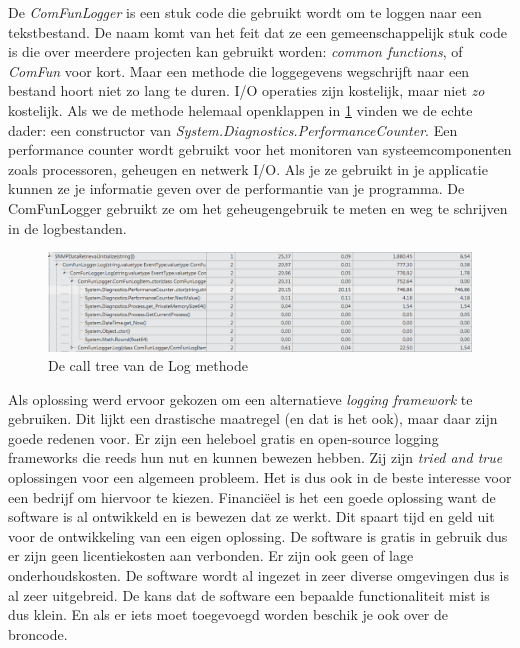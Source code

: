 De \emph{ComFunLogger} is een stuk code die gebruikt wordt om te loggen naar een tekstbestand.
De naam komt van het feit dat ze een gemeenschappelijk stuk code is die over meerdere projecten kan
gebruikt worden: \emph{common functions}, of \emph{ComFun} voor kort.
Maar een methode die loggegevens wegschrijft naar een bestand hoort niet zo lang te duren.
I/O operaties zijn kostelijk, maar niet \emph{zo} kostelijk. 
Als we de methode helemaal openklappen in \figurenamesentence{} \ref{call-tree-performancecounter} vinden we de echte dader:
een constructor van \emph{System.Diagnostics.PerformanceCounter}.
Een performance counter wordt gebruikt voor het monitoren van systeemcomponenten zoals
processoren, geheugen en netwerk I/O. Als je ze gebruikt in je applicatie kunnen ze je 
informatie geven over de performantie van je programma.\cite{performance-counters-intro}
De ComFunLogger gebruikt ze om het geheugengebruik te meten en weg te schrijven in de logbestanden.

\begin{figure}[h]
	\centering
	\includegraphics[scale=0.50]{figures/profiler/call-tree-performancecounter}
	\caption{De call tree van de Log methode}
	\label{call-tree-performancecounter}
\end{figure}


Als oplossing werd ervoor gekozen om een alternatieve \emph{logging framework} te gebruiken.
Dit lijkt een drastische maatregel (en dat is het ook), maar daar zijn goede redenen voor.
Er zijn een heleboel gratis en open-source logging frameworks die reeds hun nut en kunnen bewezen hebben.
Zij zijn \emph{tried and true} oplossingen voor een algemeen probleem. 
Het is dus ook in de beste interesse voor een bedrijf om hiervoor te kiezen. 
Financiëel is het een goede oplossing want de software is al ontwikkeld en is bewezen dat ze werkt.
Dit spaart tijd en geld uit voor de ontwikkeling van een eigen oplossing.
De software is gratis in gebruik dus er zijn geen licentiekosten aan verbonden.
Er zijn ook geen of lage onderhoudskosten. De software wordt al ingezet in zeer diverse omgevingen dus is al zeer uitgebreid.
De kans dat de software een bepaalde functionaliteit mist is dus klein.
En als er iets moet toegevoegd worden beschik je ook over de broncode.


